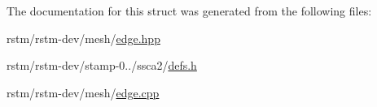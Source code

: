 The documentation for this struct was generated from the following files\-:\begin{DoxyCompactItemize}
\item 
rstm/rstm-\/dev/mesh/\hyperlink{edge_8hpp}{edge.\-hpp}\item 
rstm/rstm-\/dev/stamp-\/0../ssca2/\hyperlink{defs_8h}{defs.\-h}\item 
rstm/rstm-\/dev/mesh/\hyperlink{edge_8cpp}{edge.\-cpp}\end{DoxyCompactItemize}
